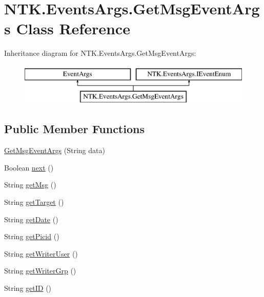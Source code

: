 \hypertarget{class_n_t_k_1_1_events_args_1_1_get_msg_event_args}{}\section{N\+T\+K.\+Events\+Args.\+Get\+Msg\+Event\+Args Class Reference}
\label{class_n_t_k_1_1_events_args_1_1_get_msg_event_args}


 


Inheritance diagram for N\+T\+K.\+Events\+Args.\+Get\+Msg\+Event\+Args\+:\begin{figure}[H]
\begin{center}
\leavevmode
\includegraphics[height=2.000000cm]{d1/d5b/class_n_t_k_1_1_events_args_1_1_get_msg_event_args}
\end{center}
\end{figure}
\subsection*{Public Member Functions}
\begin{DoxyCompactItemize}
\item 
\mbox{\hyperlink{class_n_t_k_1_1_events_args_1_1_get_msg_event_args_a03ce547bdbc95f87c488a4f89e27960c}{Get\+Msg\+Event\+Args}} (String data)
\item 
Boolean \mbox{\hyperlink{class_n_t_k_1_1_events_args_1_1_get_msg_event_args_ac22d3fa7eb7350703d07127f9a5d5ca0}{next}} ()
\item 
String \mbox{\hyperlink{class_n_t_k_1_1_events_args_1_1_get_msg_event_args_ac933c655f86889a0f238ca5054166091}{get\+Msg}} ()
\item 
String \mbox{\hyperlink{class_n_t_k_1_1_events_args_1_1_get_msg_event_args_ae1cc1aca5b73743c903247af4b300c80}{get\+Target}} ()
\item 
String \mbox{\hyperlink{class_n_t_k_1_1_events_args_1_1_get_msg_event_args_a85a010980575f91d1a5e066b62a2e2e6}{get\+Date}} ()
\item 
String \mbox{\hyperlink{class_n_t_k_1_1_events_args_1_1_get_msg_event_args_a17bf9d90a6147cb45467dc7b876f68e7}{get\+Picid}} ()
\item 
String \mbox{\hyperlink{class_n_t_k_1_1_events_args_1_1_get_msg_event_args_a08ab040d601503381f6ec85aab38da4a}{get\+Writer\+User}} ()
\item 
String \mbox{\hyperlink{class_n_t_k_1_1_events_args_1_1_get_msg_event_args_a23bbb8f782acd6342f99c4939d7c6b9a}{get\+Writer\+Grp}} ()
\item 
String \mbox{\hyperlink{class_n_t_k_1_1_events_args_1_1_get_msg_event_args_acca9af0bd878f3da5e6044baa8a11266}{get\+ID}} ()
\end{DoxyCompactItemize}



